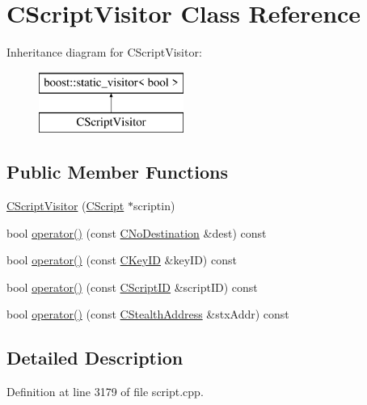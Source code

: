 \hypertarget{class_c_script_visitor}{}\section{C\+Script\+Visitor Class Reference}
\label{class_c_script_visitor}
Inheritance diagram for C\+Script\+Visitor\+:\begin{figure}[H]
\begin{center}
\leavevmode
\includegraphics[height=2.000000cm]{class_c_script_visitor}
\end{center}
\end{figure}
\subsection*{Public Member Functions}
\begin{DoxyCompactItemize}
\item 
\hyperlink{class_c_script_visitor_acfe7eb4f2ddca134614bf7583e73b3da}{C\+Script\+Visitor} (\hyperlink{class_c_script}{C\+Script} $\ast$scriptin)
\item 
bool \hyperlink{class_c_script_visitor_a1afc8621b36e777fe8946653de3c68cb}{operator()} (const \hyperlink{class_c_no_destination}{C\+No\+Destination} \&dest) const 
\item 
bool \hyperlink{class_c_script_visitor_a15652105241c6f980475a6a5f6029e83}{operator()} (const \hyperlink{class_c_key_i_d}{C\+Key\+I\+D} \&key\+I\+D) const 
\item 
bool \hyperlink{class_c_script_visitor_ad1432cb27a3f34f778423cb803f989ea}{operator()} (const \hyperlink{class_c_script_i_d}{C\+Script\+I\+D} \&script\+I\+D) const 
\item 
bool \hyperlink{class_c_script_visitor_a76c756a23fbf7f0a0be975b78d16cb38}{operator()} (const \hyperlink{class_c_stealth_address}{C\+Stealth\+Address} \&stx\+Addr) const 
\end{DoxyCompactItemize}


\subsection{Detailed Description}


Definition at line 3179 of file script.\+cpp.



